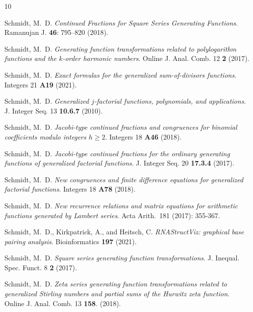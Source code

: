 \documentclass[10pt,reqno,letterpaper]{article}
\theoremstyle{plain}
\numberwithin{theorem}{section}
\theoremstyle{definition}
\newcounter{completeBibitemIncrementCtr}
\renewenvironment{thebibliography}[1]{
     \renewcommand{\refname}{} 
     
     \begin{oldthebibliography}{#1}
     \setlength{\itemsep}{-0.6mm}
     \setlength{\parskip}{0em}
     \setlength{\topsep}{0pt}
     \setlength{\partopsep}{0pt}
     \setcounter{enumiv}{\value{completeBibitemIncrementCtr}}
     \normalsize%
}
{
     \setcounter{completeBibitemIncrementCtr}{\value{enumiv}}
     \end{oldthebibliography}
}
\begin{document}
\begin{thebibliography}{10}
Schmidt, M.~D. \emph{Continued Fractions for Square Series Generating Functions}. 
Ramanujan J. {\bf 46}: 795--820 (2018). 

Schmidt, M.~D. \emph{Generating function transformations related to 
                     polylogarithm functions and the $k$-order harmonic numbers}. 
Online J. Anal. Comb. 12 {\bf 2} (2017). 

Schmidt, M.~D. \emph{Exact formulas for the generalized sum-of-divisors functions}. 
Integers 21 {\bf A19} (2021). 

Schmidt, M.~D. \emph{Generalized $j$-factorial functions, polynomials, and applications}. 
J. Integer Seq. 13 {\bf 10.6.7}  (2010). 

Schmidt, M.~D. \emph{Jacobi-type continued fractions and congruences for 
                     binomial coefficients modulo integers $h \geq 2$}. 
Integers 18 {\bf A46} (2018). 

Schmidt, M.~D. \emph{Jacobi-type continued fractions for the ordinary generating functions of 
                     generalized factorial functions}. 
J. Integer Seq. 20 {\bf 17.3.4} (2017). 

Schmidt, M.~D. \emph{New congruences and finite difference equations for generalized factorial functions}. 
Integers 18 {\bf A78} (2018). 

Schmidt, M.~D. \emph{New recurrence relations and matrix equations for 
                     arithmetic functions generated by Lambert series}. 
Acta Arith. 181 (2017): 355-367. 

Schmidt, M.~D., Kirkpatrick, A., and Heitsch, C. \emph{RNAStructViz: graphical base pairing analysis}. 
Bioinformatics {\bf 197} (2021). 

Schmidt, M.~D. \emph{Square series generating function transformations}. 
J. Inequal. Spec. Funct. 8 {\bf 2} (2017). 

Schmidt, M.~D. \emph{Zeta series generating function transformations related to 
                     generalized Stirling numbers and partial sums of the Hurwitz zeta function}. 
Online J. Anal. Comb. 13 {\bf 158}. (2018). 

\end{thebibliography}
\end{document}
